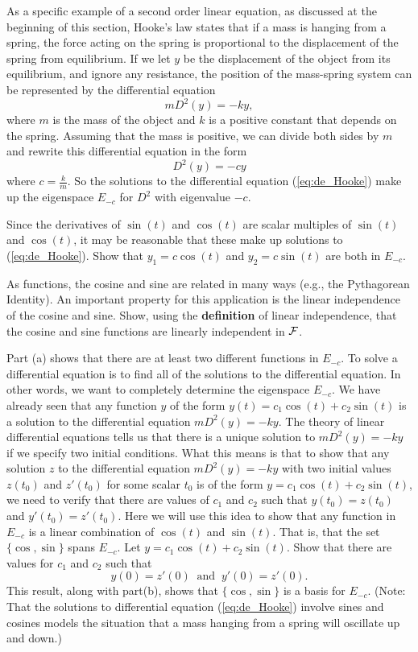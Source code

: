 \begin{pactivity} \label{act:de_Hooke} As a specific example of a second order linear equation, as discussed at the beginning of this section, Hooke's law states that if a mass is hanging from a spring, the force acting on the spring is proportional to the displacement of the spring from equilibrium. If we let $y$ be the displacement of the object from its equilibrium, and ignore any resistance, the position of the mass-spring system can be represented by the differential equation
\[mD^2(y) = -ky,\]
where $m$ is the mass of the object and $k$ is a positive constant that depends on the spring. Assuming that the mass is positive, we can divide both sides by $m$ and rewrite this differential equation in the form
\begin{equation} \label{eq:de_Hooke}
D^2(y) = -cy
\end{equation}
where $c = \frac{k}{m}$. So the solutions to the differential equation (\ref{eq:de_Hooke}) make up the eigenspace $E_{-c}$ for $D^2$ with eigenvalue $-c$. 
	\ba
	\item Since the derivatives of $\sin(t)$ and $\cos(t)$ are scalar multiples of $\sin(t)$ and $\cos(t)$, it may be reasonable that these make up solutions to (\ref{eq:de_Hooke}). Show that $y_1 = c\cos(t)$ and $y_2 = c\sin(t)$ are both in $E_{-c}$. 
	
	\item As functions, the cosine and sine are related in many ways (e.g., the Pythagorean Identity). An important property for this application is the linear independence of the cosine and sine. Show, using the \textbf{definition} of linear independence, that the cosine and sine functions are linearly independent in $\mathcal{F}$.
	
	\item Part (a) shows that there are at least two different functions in $E_{-c}$. To solve a differential equation is to find all of the solutions to the differential equation. In other words, we want to completely determine the eigenspace $E_{-c}$. We have already seen that any function $y$ of the form $y(t) = c_1 \cos(t) + c_2 \sin(t)$ is a solution to the differential equation $mD^2(y) = -ky$. The theory of linear differential equations tells us that there is a unique solution to $mD^2(y) = -ky$ if we specify two initial conditions. What this means is that to show that any solution $z$ to the differential equation $mD^2(y) = -ky$ with two initial values $z(t_0)$ and $z'(t_0)$ for some scalar $t_0$ is of the form $y = c_1 \cos(t) + c_2 \sin(t)$, we need to verify that there are values of $c_1$ and $c_2$ such that $y(t_0) = z(t_0)$ and $y'(t_0) = z'(t_0)$.  Here we will use this idea to show that any function in $E_{-c}$ is a linear combination of $\cos(t)$ and $\sin(t)$. That is, that the set $\{\cos, \sin\}$ spans $E_{-c}$.  Let $y = c_1 \cos(t) + c_2 \sin(t)$. Show that there are values for $c_1$ and $c_2$ such that 
	\[y(0) = z'(0) \ \text{ and } \ y'(0) = z'(0).\]
This result, along with part(b), shows that $\{\cos, \sin\}$ is a basis for $E_{-c}$. (Note: That the solutions to differential equation (\ref{eq:de_Hooke}) involve sines and cosines models the situation that a mass hanging from a spring will oscillate up and down.)
	

\end{pactivity}
